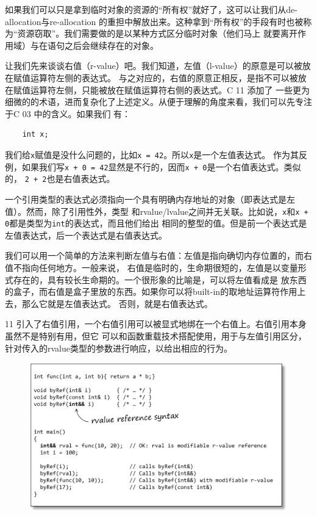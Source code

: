 \documentclass[12pt]{article}
\newcommand{\CC}{C\nolinebreak\hspace{-.05em}\raisebox{.4ex}{\tiny\bf +}%
\nolinebreak\hspace{-.10em}\raisebox{.4ex}{\tiny\bf +}}
\begin{document}
\indent{}如果我们可以只是拿到临时对象的资源的“所有权”就好了，这可以让我们从de-allocation与re-allocation
的重担中解放出来。这种拿到“所有权”的手段有时也被称为“资源窃取”。我们需要做的是以某种方式区分临时对象（他们马上
就要离开作用域）与在语句之后会继续存在的对象。

\indent{}让我们先来谈谈右值（r-value）吧。我们知道，左值（l-value）的原意是可以被放在赋值运算符左侧的表达式。
与之对应的，右值的原意正相反，是指不可以被放在赋值运算符左侧，只能被放在赋值运算符右侧的表达式。{\CC}11 添加了
一些更为细微的的术语，进而复杂化了上述定义。从便于理解的角度来看，我们可以先专注于{\CC}03 中的含义。如果我们
有：

\begin{verbatim}
    int x;
\end{verbatim}

\indent{}我们给\texttt{x}赋值是没什么问题的，比如\texttt{x = 42}。所以\texttt{x}是一个左值表达式。
作为其反例，如果我们写\texttt{x + 0 = 42}显然是不行的，因而\texttt{x + 0}是一个右值表达式。类似的，
\texttt{2 + 2}也是右值表达式。

\indent{}一个引用类型的表达式必须指向一个具有明确内存地址的对象（即表达式是左值）。然而，除了引用性外，类型
和rvalue/lvalue之间并无关联。比如说，\texttt{x}和\texttt{x + 0}都是类型为\texttt{int}的表达式，而且他们给出
相同的整型的值。但是前一个表达式是左值表达式，后一个表达式是右值表达式。

\indent{}我们可以用一个简单的方法来判断左值与右值：左值是指向确切内存位置的，而右值不指向任何地方。一般来说，
右值是临时的，生命期很短的，左值是以变量形式存在的，具有较长生命期的。一个很形象的比喻是，可以将左值看成是
放东西的盒子，而右值是盒子里放的东西。如果你可以将built-in的取地址运算符作用上去，那么它就是左值表达式。
否则，就是右值表达式。

\indent{}{\CC}11 引入了右值引用，一个右值引用可以被显式地绑在一个右值上。右值引用本身虽然不是特别有用，但它
可以和函数重载技术搭配使用，用于与左值引用区分，针对传入的rvalue类型的参数进行响应，以给出相应的行为。

\begin{figure}[h]
\centering
\includegraphics[width=12cm]{./imgs/image.F3BZS0.png}
\end{figure}
\end{document}
